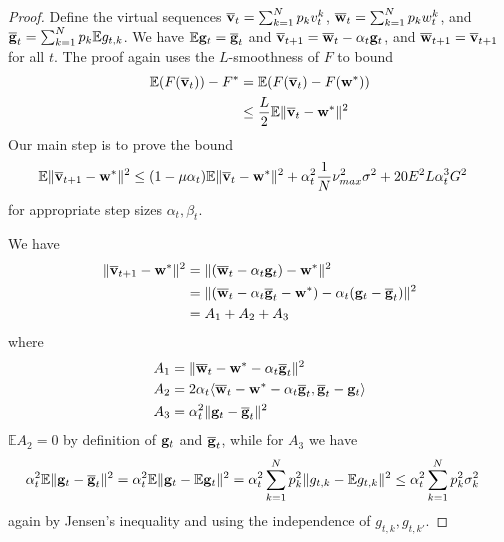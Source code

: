 \begin{proof}
Define the virtual sequences ${\overline{\mathbf{v}}}_{t}=\sum_{k=1}^{N}p_{k}v_{t}^{k}$,
${\overline{\mathbf{w}}}_{t}=\sum_{k=1}^{N}p_{k}w_{t}^{k}$, and ${\overline{\mathbf{g}}}_{t}=\sum_{k=1}^{N}p_{k}\mathbb{E}g_{t,k}$.
We have $\mathbb{E}{\mathbf{g}}_{t}={\overline{\mathbf{g}}}_{t}$ and ${\overline{\mathbf{v}}}_{t+1}={\overline{\mathbf{w}}}_{t}-\alpha_{t}{\mathbf{g}}_{t}$,
and ${\overline{\mathbf{w}}}_{t+1}={\overline{\mathbf{v}}}_{t+1}$ for all $t$. The proof
again uses the $L$-smoothness of $F$ to bound 
\begin{align*}
\mathbb{E}(F({\overline{\mathbf{v}}}_{t}))-F^{\ast} & =\mathbb{E}(F({\overline{\mathbf{v}}}_{t})-F({\mathbf{w}}^{\ast}))\\
& \leq\frac{L}{2}\mathbb{E}\|{\overline{\mathbf{v}}}_{t}-{\mathbf{w}}^{\ast}\|^{2}
\end{align*}
Our main step is to prove the bound
\begin{align*}
\mathbb{E}\|{\overline{\mathbf{v}}}_{t+1}-{\mathbf{w}}^{\ast}\|^{2} & \leq(1-\mu\alpha_{t})\mathbb{E}\|{\overline{\mathbf{v}}}_{t}-{\mathbf{w}}^{\ast}\|^{2}+\alpha_{t}^{2}\frac{1}{N}\nu_{max}^{2}\sigma^{2}+20E^{2}L\alpha_{t}^{3}G^{2}
\end{align*}
 for appropriate step sizes $\alpha_{t},\beta_{t}$.

We have 
\begin{align*}
\|{\overline{\mathbf{v}}}_{t+1}-{\mathbf{w}}^{\ast}\|^{2} & =\|({\overline{\mathbf{w}}}_{t}-\alpha_{t}{\mathbf{g}}_{t})-{\mathbf{w}}^{\ast}\|^{2}\\
& =\|({\overline{\mathbf{w}}}_{t}-\alpha_{t}{\overline{\mathbf{g}}}_{t}-{\mathbf{w}}^{\ast})-\alpha_{t}({\mathbf{g}}_{t}-{\overline{\mathbf{g}}}_{t})\|^{2}\\
& =A_{1}+A_{2}+A_{3}
\end{align*}
where 
\begin{align*}
A_{1} & =\|{\overline{\mathbf{w}}}_{t}-{\mathbf{w}}^{\ast}-\alpha_{t}{\overline{\mathbf{g}}}_{t}\|^{2}\\
A_{2} & =2\alpha_{t}\langle{\overline{\mathbf{w}}}_{t}-{\mathbf{w}}^{\ast}-\alpha_{t}{\overline{\mathbf{g}}}_{t},{\overline{\mathbf{g}}}_{t}-{\mathbf{g}}_{t}\rangle\\
A_{3} & =\alpha_{t}^{2}\|{\mathbf{g}}_{t}-{\overline{\mathbf{g}}}_{t}\|^{2}
\end{align*}
$\mathbb{E}A_{2}=0$ by definition of ${\mathbf{g}}_{t}$ and ${\overline{\mathbf{g}}}_{t}$,
while for $A_{3}$ we have
\begin{align*}
\alpha_{t}^{2}\mathbb{E}\|{\mathbf{g}}_{t}-{\overline{\mathbf{g}}}_{t}\|^{2} & =\alpha_{t}^{2}\mathbb{E}\|{\mathbf{g}}_{t}-\mathbb{E}{\mathbf{g}}_{t}\|^{2}=\alpha_{t}^{2}\sum_{k=1}^{N}p_{k}^{2}\|g_{t,k}-\mathbb{E}g_{t,k}\|^{2}\leq\alpha_{t}^{2}\sum_{k=1}^{N}p_{k}^{2}\sigma_{k}^{2}
\end{align*}
again by Jensen's inequality and using the independence of $g_{t,k},g_{t,k'}$. 


\end{proof}
